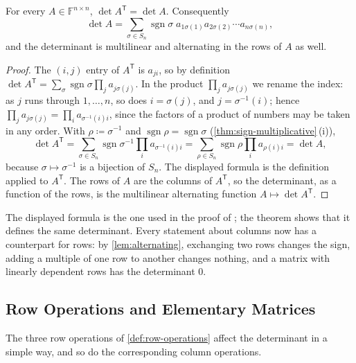 \begin{theorem}
\label{thm:det-transpose}
For every $A\in\mathbb F^{n\times n}$, $\det A^{\mathsf T}=\det A$. Consequently
\[
\det A=\sum_{\sigma\in S_n}\operatorname{sgn}\sigma\;a_{1\sigma(1)}a_{2\sigma(2)}\cdots a_{n\sigma(n)},
\]
and the determinant is multilinear and alternating in the rows of $A$ as well.
\end{theorem}

\begin{proof}
The $(i,j)$ entry of $A^{\mathsf T}$ is $a_{ji}$, so by definition $\det A^{\mathsf T}=\sum_\sigma\operatorname{sgn}\sigma\prod_ja_{j\sigma(j)}$. In the product $\prod_ja_{j\sigma(j)}$ we rename the index: as $j$ runs through $1,\ldots,n$, so does $i=\sigma(j)$, and $j=\sigma^{-1}(i)$; hence $\prod_ja_{j\sigma(j)}=\prod_ia_{\sigma^{-1}(i)i}$, since the factors of a product of numbers may be taken in any order. With $\rho\coloneqq\sigma^{-1}$ and $\operatorname{sgn}\rho=\operatorname{sgn}\sigma$ (\cref{thm:sign-multiplicative}\,(i)),
\[
\det A^{\mathsf T}=\sum_{\sigma\in S_n}\operatorname{sgn}\sigma^{-1}\prod_ia_{\sigma^{-1}(i)i}=\sum_{\rho\in S_n}\operatorname{sgn}\rho\prod_ia_{\rho(i)i}=\det A,
\]
because $\sigma\mapsto\sigma^{-1}$ is a bijection of $S_n$. The displayed formula is the definition applied to $A^{\mathsf T}$. The rows of $A$ are the columns of $A^{\mathsf T}$, so the determinant, as a function of the rows, is the multilinear alternating function $A\mapsto\det A^{\mathsf T}$.
\end{proof}

The displayed formula is the one used in the proof of ; the theorem shows that it defines the same determinant. Every statement about columns now has a counterpart for rows: by \cref{lem:alternating}, exchanging two rows changes the sign, adding a multiple of one row to another changes nothing, and a matrix with linearly dependent rows has the determinant $0$.

\subsection{Row Operations and Elementary Matrices}

The three row operations of \cref{def:row-operations} affect the determinant in a simple way, and so do the corresponding column operations.

